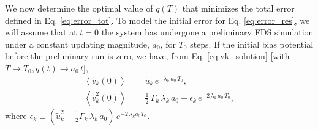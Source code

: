\documentclass[preprint, superscriptaddress, floatfix]{revtex4-1}
\begin{document}
We now determine the optimal value of $q(T)$
that minimizes the total error defined in Eq. \eqref{eq:error_tot}.
%
To model the initial error for Eq. \eqref{eq:error_res},
we will assume that at $t = 0$
the system has undergone a preliminary FDS simulation
under a constant updating magnitude, $a_0$,
for $T_0$ steps.
%
If the initial bias potential
before the preliminary run is zero,
we have, from Eq. \eqref{eq:vk_solution} [with $T\to T_0, q(t) \to a_0 \, t$],
%
\begin{align}
  \left\langle {\tilde v}_k(0) \right\rangle
  &=
  \tilde u_k \, e^{-\lambda_k \, a_0 \, T_0}
  ,
  \label{eq:xt_eql}
  \\
  \left\langle \tilde v_k^2(0) \right\rangle
  &=
  \frac 1 2 \, \Gamma_k \, \lambda_k \, a_0
  +
  \epsilon_k \, e^{-2 \, \lambda_k \, a_0 \, T_0}
  ,
  \label{eq:xt2_eql}
\end{align}
%
where
$\epsilon_k \equiv \left(\tilde u_k^2 - \frac{1}{2} \Gamma_k \, \lambda_k \, a_0\right) \, e^{-2\,\lambda_k a_0 T_0}$.
\end{document}

